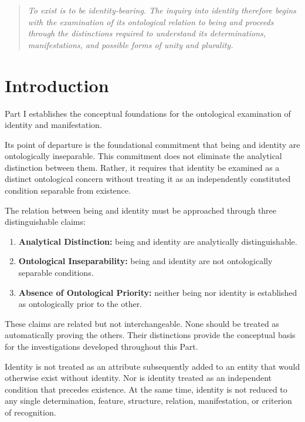 \begin{quote}
\textit{
To exist is to be identity-bearing. The inquiry into identity
therefore begins with the examination of its ontological
relation to being and proceeds through the distinctions
required to understand its determinations, manifestations,
and possible forms of unity and plurality.
}
\end{quote}



\section*{Introduction}

Part I establishes the conceptual foundations for the
ontological examination of identity and manifestation.

Its point of departure is the foundational commitment
that being and identity are ontologically inseparable.
This commitment does not eliminate the analytical
distinction between them. Rather, it requires that identity
be examined as a distinct ontological concern without
treating it as an independently constituted condition
separable from existence.

The relation between being and identity must be approached
through three distinguishable claims:

\begin{enumerate}
    \item \textbf{Analytical Distinction:} being and identity
    are analytically distinguishable.

    \item \textbf{Ontological Inseparability:} being and identity
    are not ontologically separable conditions.

    \item \textbf{Absence of Ontological Priority:} neither being
    nor identity is established as ontologically prior to
    the other.
\end{enumerate}

These claims are related but not interchangeable. None
should be treated as automatically proving the others.
Their distinctions provide the conceptual basis for the
investigations developed throughout this Part.

Identity is not treated as an attribute subsequently added
to an entity that would otherwise exist without identity.
Nor is identity treated as an independent condition that
precedes existence. At the same time, identity is not
reduced to any single determination, feature, structure,
relation, manifestation, or criterion of recognition.

